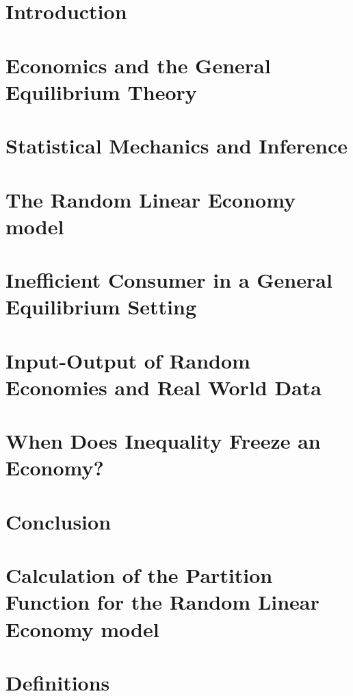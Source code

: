\PassOptionsToPackage{hyphens}{url}\documentclass[
  twoside,
  11pt, a4paper,
  footinclude=true,
  headinclude=true,
  cleardoublepage=empty
]{scrbook}
\begin{document}
\chapter{Introduction}





\chapter{Economics and the General Equilibrium Theory}
\label{cha:GET}


\chapter{Statistical Mechanics and Inference}
\label{cha:stat_mech}


\chapter{The Random Linear Economy model}
\label{cha:RLE}




\chapter{Inefficient Consumer in a General Equilibrium Setting}
\label{cha:inefficient}



\chapter{Input-Output of Random Economies and Real World Data}
\label{cha:IO}



\chapter{When Does Inequality Freeze an Economy?}
\label{cha:inequality}


\chapter{Conclusion}


\appendix

\chapter{Calculation of the Partition Function for the Random Linear
  Economy model} 
\label{app:rep}



\chapter{Definitions}
\label{app:stat}



{}

    
\end{document}
